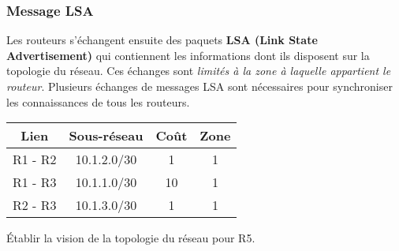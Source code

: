 \documentclass[a4paper,11pt]{article}
\begin{document}
\subsubsection{Message LSA}
Les routeurs s'échangent ensuite des paquets \textbf{LSA (Link State Advertisement)} qui contiennent les informations dont ils disposent sur la topologie du réseau. Ces échanges sont \emph{limités à la zone à laquelle appartient le routeur}. Plusieurs échanges de messages LSA sont nécessaires pour synchroniser les connaissances de tous les routeurs.
\begin{center}
    \begin{tabular}{|*{4}{c|}}
        \hline
        Lien & Sous-réseau & Coût & Zone \\
        \hline
        R1 - R2 & 10.1.2.0/30 & 1 & 1 \\
        \hline
        R1 - R3 & 10.1.1.0/30 & 10 & 1 \\
        \hline
        R2 - R3 & 10.1.3.0/30 & 1 & 1 \\
        \hline
    \end{tabular}
\end{center}
\begin{activite}
Établir la vision de la topologie du réseau pour R5.
\end{activite}
\end{document}
